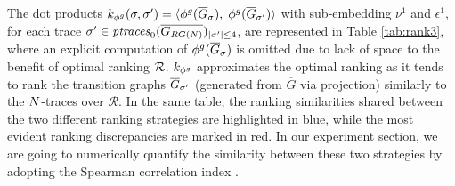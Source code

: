 \begin{example}%
	The dot products $k_{\gorgembed}(\logtrace,\nonlogtrace)=\braket{\gorgembed(\overline{G}_\logtrace),\;\gorgembed(\overline{G}_{\nonlogtrace})}$ with sub-embedding $\nu^1$ and $\epsilon^1$, for each trace $\nonlogtrace\in\WCal{0}{4}_{|\sigma'|\leq 4}$, are represented in Table \ref{tab:rank3}, where an explicit computation of $\gorgembed(\overline{G}_\logtrace)$ is omitted due to lack of space to the benefit of optimal ranking $\goldenrank$. $k_{\gorgembed}$ approximates the optimal ranking as it tends to rank the transition graphs $\closed{G}_\nonlogtrace$ (generated from $\overline{G}$ via projection) similarly to the $\net$-traces over $\mathcal{R}$. In the same table, the ranking similarities shared between the two different ranking strategies are highlighted in blue, while the most evident ranking discrepancies are marked in red. In our experiment section, we are going to numerically quantify the similarity between these two strategies by adopting the Spearman correlation index \cite{BergamiBM20}.
\end{example}


